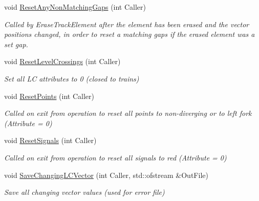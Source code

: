 \begin{DoxyCompactItemize}
void \mbox{\hyperlink{class_t_track_ac416bb4b69d75d4c5c0303a2cadd52ca}{Reset\+Any\+Non\+Matching\+Gaps}} (int Caller)
\begin{DoxyCompactList}\small\item\em Called by Erase\+Track\+Element after the element has been erased and the vector positions changed, in order to reset a matching gaps if the erased element was a set gap. \end{DoxyCompactList}\item 
\mbox{\label{class_t_track_a1a5d8cf5f3a46667a745bfcf4c77ba9d}} 
void \mbox{\hyperlink{class_t_track_a1a5d8cf5f3a46667a745bfcf4c77ba9d}{Reset\+Level\+Crossings}} (int Caller)
\begin{DoxyCompactList}\small\item\em Set all LC attributes to 0 (closed to trains) \end{DoxyCompactList}\item 
\mbox{\label{class_t_track_a84f04a79d9caca625e0b279c5690ddb7}} 
void \mbox{\hyperlink{class_t_track_a84f04a79d9caca625e0b279c5690ddb7}{Reset\+Points}} (int Caller)
\begin{DoxyCompactList}\small\item\em Called on exit from operation to reset all points to non-\/diverging or to left fork (Attribute = 0) \end{DoxyCompactList}\item 
\mbox{\label{class_t_track_acbb91e9cbc84e3dee44f1ca4de1907e8}} 
void \mbox{\hyperlink{class_t_track_acbb91e9cbc84e3dee44f1ca4de1907e8}{Reset\+Signals}} (int Caller)
\begin{DoxyCompactList}\small\item\em Called on exit from operation to reset all signals to red (Attribute = 0) \end{DoxyCompactList}\item 
\mbox{\label{class_t_track_a6e1031277500eadfd3a0751e4ca4057b}} 
void \mbox{\hyperlink{class_t_track_a6e1031277500eadfd3a0751e4ca4057b}{Save\+Changing\+L\+C\+Vector}} (int Caller, std\+::ofstream \&Out\+File)
\begin{DoxyCompactList}\small\item\em Save all changing vector values (used for error file) \end{DoxyCompactList}\item 

\end{DoxyCompactItemize}
